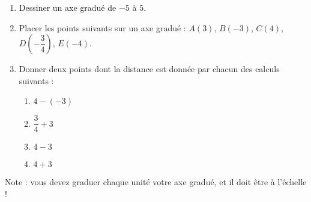 
\begin{exercice}\label{exo2smath-0238}

    \setlength{\columnseprule}{0pt}       %
    \begin{enumerate}
        \item
            Dessiner un axe gradué de \( -5\) à \( 5\).
        \item
            Placer les points suivants sur un axe gradué : \( A(3)\), \( B(-3)\), \( C(4)\), \( D(-\dfrac{ 3 }{ 4 })\), \( E(-4)\).
        \item
            Donner deux points dont la distance est donnée par chacun des calculs suivants :
            \begin{multicols}{2}
            \begin{enumerate}
                \item
                    \( 4-(-3)\)
                \item
                    \( \dfrac{ 3 }{ 4 }+3\)
                \item
                    \( 4-3\)
                \item
                    \( 4+3\)
            \end{enumerate}
            \end{multicols}
    \end{enumerate}

    Note : vous devez graduer chaque unité votre axe gradué, et il doit être à l'échelle !

\end{exercice}
